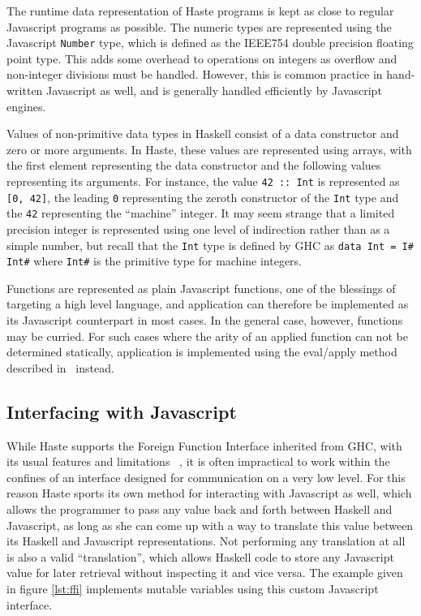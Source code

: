 \documentclass[preprint]{sigplanconf}
\begin{document}
The runtime data representation of Haste programs is kept as close to regular
Javascript programs as possible. The numeric types are represented using the
Javascript \lstinline!Number! type, which is defined as the IEEE754 double
precision floating point type. This adds some overhead to operations on
integers as overflow and non-integer divisions must be handled. However, this
is common practice in hand-written Javascript as well, and is generally handled
efficiently by Javascript engines.

Values of non-primitive data types in Haskell consist of a data constructor and
zero or more arguments. In Haste, these values are represented using arrays,
with the first element representing the data constructor and the following
values representing its arguments. For instance, the value \lstinline!42 :: Int!
is represented as \lstinline![0, 42]!, the leading \lstinline!0! representing
the zeroth constructor of the \lstinline!Int! type and the \lstinline!42!
representing the ``machine'' integer. It may seem strange that a limited
precision integer is represented using one level of indirection rather
than as a simple number, but recall that the \lstinline!Int! type is defined by
GHC as \lstinline!data Int = I# Int#! where \lstinline!Int#! is the primitive
type for machine integers.

Functions are represented as plain Javascript functions, one of the blessings
of targeting a high level language, and application can therefore be
implemented as its Javascript counterpart in most cases. In the general case,
however, functions may be curried. For such cases where the arity of an applied
function can not be determined statically, application is implemented using the
eval/apply method described in\ \cite{fastcurry} instead.

\subsection{Interfacing with Javascript}

While Haste supports the Foreign Function Interface inherited from GHC, with
its usual features and limitations \ \cite{ffi}, it is often impractical to
work within the confines of an interface designed for communication on a very
low level. For this reason Haste sports its own method for interacting with
Javascript as well, which allows the programmer to pass any value back and
forth between Haskell and Javascript, as long as she can come up with a way to
translate this value between its Haskell and Javascript representations. Not
performing any translation at all is also a valid ``translation'', which allows
Haskell code to store any Javascript value for later retrieval without
inspecting it and vice versa. The example given in figure \ref{lst:ffi}
implements mutable variables using this custom Javascript interface.
\end{document}
